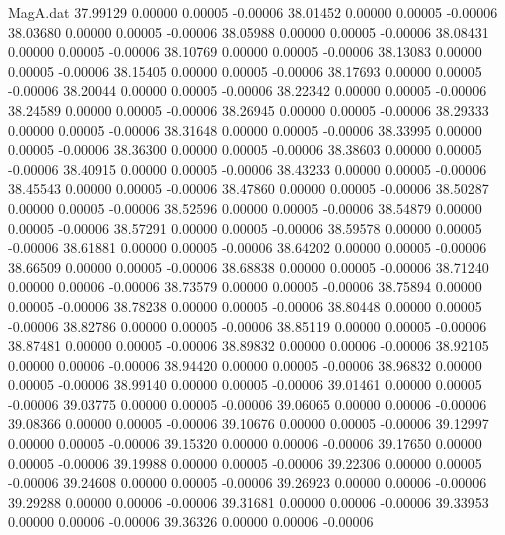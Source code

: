 \begin{filecontents}{MagA.dat}
  37.99129    0.00000    0.00005   -0.00006
  38.01452    0.00000    0.00005   -0.00006
  38.03680    0.00000    0.00005   -0.00006
  38.05988    0.00000    0.00005   -0.00006
  38.08431    0.00000    0.00005   -0.00006
  38.10769    0.00000    0.00005   -0.00006
  38.13083    0.00000    0.00005   -0.00006
  38.15405    0.00000    0.00005   -0.00006
  38.17693    0.00000    0.00005   -0.00006
  38.20044    0.00000    0.00005   -0.00006
  38.22342    0.00000    0.00005   -0.00006
  38.24589    0.00000    0.00005   -0.00006
  38.26945    0.00000    0.00005   -0.00006
  38.29333    0.00000    0.00005   -0.00006
  38.31648    0.00000    0.00005   -0.00006
  38.33995    0.00000    0.00005   -0.00006
  38.36300    0.00000    0.00005   -0.00006
  38.38603    0.00000    0.00005   -0.00006
  38.40915    0.00000    0.00005   -0.00006
  38.43233    0.00000    0.00005   -0.00006
  38.45543    0.00000    0.00005   -0.00006
  38.47860    0.00000    0.00005   -0.00006
  38.50287    0.00000    0.00005   -0.00006
  38.52596    0.00000    0.00005   -0.00006
  38.54879    0.00000    0.00005   -0.00006
  38.57291    0.00000    0.00005   -0.00006
  38.59578    0.00000    0.00005   -0.00006
  38.61881    0.00000    0.00005   -0.00006
  38.64202    0.00000    0.00005   -0.00006
  38.66509    0.00000    0.00005   -0.00006
  38.68838    0.00000    0.00005   -0.00006
  38.71240    0.00000    0.00006   -0.00006
  38.73579    0.00000    0.00005   -0.00006
  38.75894    0.00000    0.00005   -0.00006
  38.78238    0.00000    0.00005   -0.00006
  38.80448    0.00000    0.00005   -0.00006
  38.82786    0.00000    0.00005   -0.00006
  38.85119    0.00000    0.00005   -0.00006
  38.87481    0.00000    0.00005   -0.00006
  38.89832    0.00000    0.00006   -0.00006
  38.92105    0.00000    0.00006   -0.00006
  38.94420    0.00000    0.00005   -0.00006
  38.96832    0.00000    0.00005   -0.00006
  38.99140    0.00000    0.00005   -0.00006
  39.01461    0.00000    0.00005   -0.00006
  39.03775    0.00000    0.00005   -0.00006
  39.06065    0.00000    0.00006   -0.00006
  39.08366    0.00000    0.00005   -0.00006
  39.10676    0.00000    0.00005   -0.00006
  39.12997    0.00000    0.00005   -0.00006
  39.15320    0.00000    0.00006   -0.00006
  39.17650    0.00000    0.00005   -0.00006
  39.19988    0.00000    0.00005   -0.00006
  39.22306    0.00000    0.00005   -0.00006
  39.24608    0.00000    0.00005   -0.00006
  39.26923    0.00000    0.00006   -0.00006
  39.29288    0.00000    0.00006   -0.00006
  39.31681    0.00000    0.00006   -0.00006
  39.33953    0.00000    0.00006   -0.00006
  39.36326    0.00000    0.00006   -0.00006

\end{filecontents}
